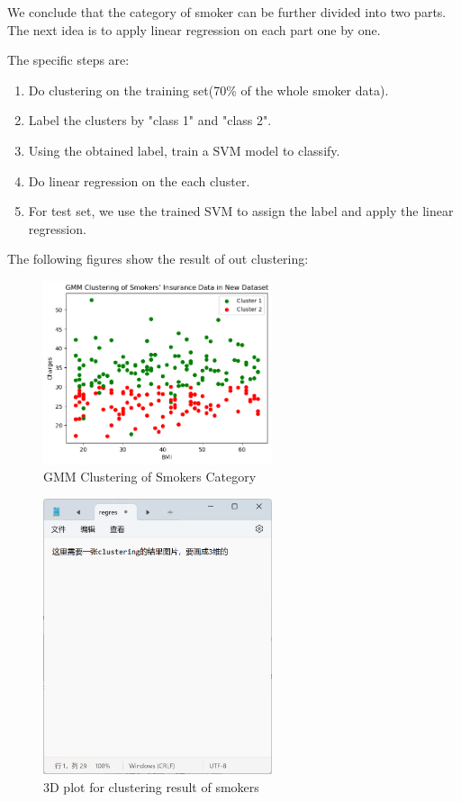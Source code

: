 \documentclass[12pt,a4paper]{article}
\begin{document}
\par We conclude that the category of smoker can be further divided into two parts. The next idea is to apply linear regression on each part one by one.
\par The specific steps are:
\begin{enumerate}
\item Do clustering on the training set(70\% of the whole smoker data). 
\item Label the clusters by "class 1" and "class 2".
\item Using the obtained label, train a SVM model to classify.
\item Do linear regression on the each cluster.
\item For test set, we use the trained SVM to assign the label and apply the linear regression.
\end{enumerate}

The following figures show the result of out clustering:
\begin{figure}[H]
\centering
\includegraphics[width=0.6\textwidth]{GMM_clustering_smoker.png}
\caption{GMM Clustering of Smokers Category}
\end{figure}
\begin{figure}[H]
\centering
\includegraphics[width = 0.6\textwidth]{clustering_smoker_3d_plot.png}
\caption{3D plot for clustering result of smokers}
\end{figure}
\end{document}
